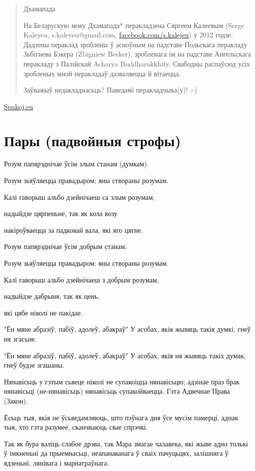 \documentclass{article}
\begin{document}
\begin{quote}
Дхамапада

На Беларускую мову Дхамапада* перакладзена Сяргеем Калеевым (Serge
Kaleyeu, s.kaleyeu@gmail.com,
\href{http://www.facebook.com/s.kalejeu}{facebook.com/s.kalejeu}) у 2012
годзе. Дадзены пераклад зроблены ў асноўным на падставе Польскага
перакладу Зьбігнева Бэкера (Zbigniew Becker), зробленага ім на падставе
Ангельскага перакладу з Палійскай Acharya Buddharakkhity. Свабодны
распаўсюд усіх зробленых мной перакладаў дазваляецца й вітаецца.

Заўважыў недакладнасьць? Паведамі перакладчыка(у)! :-)
\end{quote}

\href{http://www.Spakoj.eu}{Spakoj.eu}

\section{Пары (падвойныя строфы)}

Розум папярэднічае ўсім злым станам (думкам).

Розум зьяўляецца правадыром; яны створаны розумам.

Калі гаворыш альбо дзейнічаеш са злым розумам,

надыйдзе цярпеньне, так як кола возу

накіроўваецца за падковай вала, які яго цягне.

Розум папярэднічае ўсім добрым станам.

Розум зьяўляецца правадыром; яны створаны розумам.

Калі гаворыш альбо дзейнічаеш з добрым розумам,

надыйдзе дабрыня, так як цень,

які цябе ніколі не пакідае.

"Ён мяне абразіў, пабіў, адолеў, абакраў" 
У асобах, якія жывяць такія думкі, гнеў ня згасьне.

"Ён мяне абразіў, пабіў, адолеў, абакраў" 
У асобах, якія ня жывяць такіх думак, гнеў будзе згашаны.

Нянавісьць у гэтым сьвеце ніколі не супакоіцца нянавісьцю; адзінае
праз брак нянавісьці (не-нянавісьць) нянавісьць супакойваецца. Гэта
Адвечнае Права (Закон).

Ёсьць тыя, якія не ўсьведамляюць, што пэўнага дня ўсе мусім памерці,
аднак тыя, хто гэта разумее, сканчваюць свае спрэчкі.

Так як бура валіць слабое дрэва, так Мара змагае чалавека, які жыве
адно толькі ў імкненьні да прыемнасьці, неапанаванага ў сваіх пачуцьцях,
залішняга ў ядзеньні, лянівага і марнатраўнага.
\end{document}
